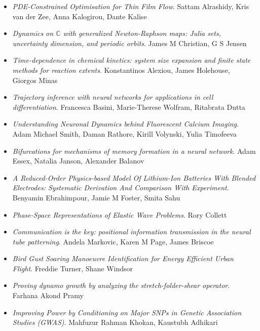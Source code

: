 \begin{itemize}
\item \textit{PDE-Constrained Optimisation for Thin Film Flow}.
Sattam Alrashidy, Kris van der Zee, Anna Kalogirou, Dante Kalise

\item \textit{Dynamics on $\mathbb{C}$ with generalized Newton-Raphson maps: Julia sets, uncertainty dimension, and periodic orbits}.
James M Christian, G S Jensen

\item \textit{Time-dependence in chemical kinetics: system size expansion and finite state methods for reaction extents}.
Konstantinos Alexiou, James Holehouse, Giorgos Minas

\item \textit{Trajectory inference with neural networks for applications in cell differentiation}.
Francesca Basini, Marie-Therese Wolfram, Ritabrata Dutta

\item \textit{Understanding Neuronal Dynamics behind Fluorescent Calcium Imaging}.
Adam Michael Smith, Daman Rathore, Kirill Volynski, Yulia Timofeeva

\item \textit{Bifurcations for mechanisms of memory formation in a neural network}.
Adam Essex, Natalia Janson, Alexander Balanov

\item \textit{A Reduced-Order Physics-based Model Of Lithium-Ion Batteries With Blended Electrodes: Systematic Derivation And Comparison With Experiment}.
Benyamin Ebrahimpour, Jamie M Foster, Smita Sahu

\item \textit{Phase-Space Representations of Elastic Wave Problems}.
Rory Collett

\item \textit{Communication is the key: positional information transmission in the neural tube patterning}.
Andela Markovic, Karen M Page, James Briscoe

\item \textit{Bird Gust Soaring Manoeuvre Identification for Energy Efficient Urban Flight}.
Freddie Turner, Shane Windsor

\item \textit{Proving dynamo growth by analyzing the stretch-folder-shear operator}.
Farhana Akond Pramy

\item \textit{Improving Power by Conditioning on Major SNPs in Genetic Association Studies (GWAS)}.
Mahfuzur Rahman Khokan, Kaustubh Adhikari

\end{itemize}

